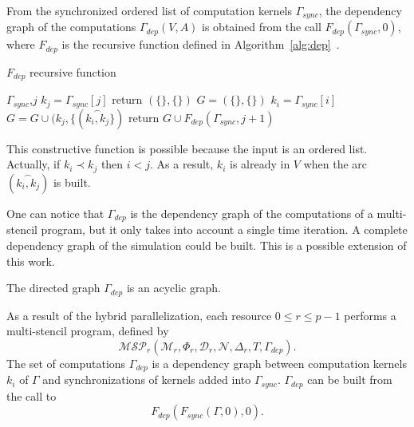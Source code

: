 \begin{mydef}
From the synchronized ordered list of computation kernels $\Gamma_{sync}$, the dependency graph of the computations $\Gamma_{dep}(V,A)$ is obtained from the call $F_{dep}(\Gamma_{sync},0)$, where $F_{dep}$ is the recursive function defined in Algorithm~\ref{alg:dep}~.
\end{mydef}

\begin{algorithm}
\caption{$F_{dep}$ recursive function}
\label{alg:dep}
\begin{algorithmic}[1]
 {$\Gamma_{sync}$,$j$}
\State $k_j = \Gamma_{sync}[j]$
\State return $(\{\},\{\})$
\State $G=(\{\},\{\})$
\State $k_i = \Gamma_{sync}[i]$
\State $G = G \cup (k_j, \{(\overset{\frown}{k_i,k_j} \})$
\EndIf
\EndFor
\State return $G \cup F_{dep}(\Gamma_{sync},j+1)$
\EndIf
\EndProcedure
\end{algorithmic}
\end{algorithm}

This constructive function is possible because the input is an ordered list. Actually, if $k_i\prec k_j$ then $i<j$. As a result, $k_i$ is already in $V$ when the arc $(\overset{\frown}{k_i,k_j})$ is built.

One can notice that $\Gamma_{dep}$ is the dependency graph of the computations of a multi-stencil program, but it only takes into account a single time iteration. A complete dependency graph of the simulation could be built. This is a possible extension of this work.

\begin{myprop}
The directed graph $\Gamma_{dep}$ is an acyclic graph.
\end{myprop}

As a result of the hybrid parallelization, each resource $0 \leq r \leq p-1$ performs a multi-stencil program, defined by
\begin{equation*}
\mathcal{MSP}_r(\mathcal{M}_r,\Phi_r,\mathcal{D}_r,\mathcal{N},\Delta_r,T,\Gamma_{dep}).
\end{equation*}
The set of computations $\Gamma_{dep}$ is a dependency graph between computation kernels $k_i$ of $\Gamma$ and synchronizations of kernels added into $\Gamma_{sync}$. $\Gamma_{dep}$ can be built from the call to 
\begin{equation*}
F_{dep}(F_{sync}(\Gamma,0),0).
\end{equation*}

